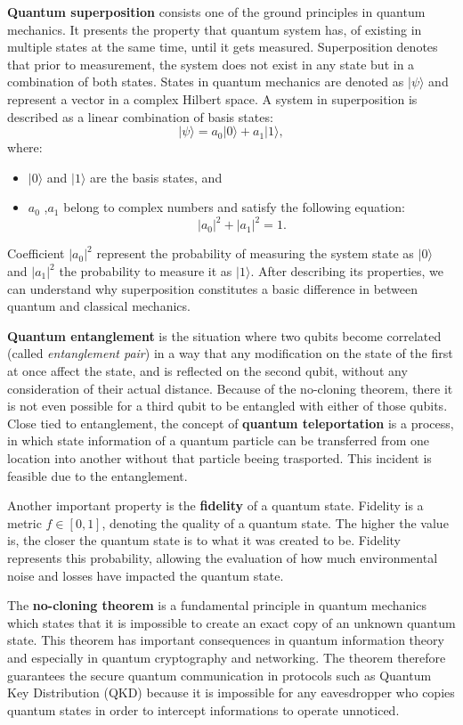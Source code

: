 \documentclass[12pt,a4paper] {report}
\begin{document}
		\textbf{Quantum superposition} consists one of the ground principles in quantum mechanics. 
		It presents the property that quantum system has, of existing in multiple states at the same time, until it gets measured. 
		Superposition denotes that prior to measurement, the system does not exist in any state but in a combination of both states.
		States in quantum mechanics are denoted as $|\psi\rangle$ and represent a vector in a complex Hilbert space. 
		A system in superposition is described as a linear combination of basis states:
			\[
			|\psi\rangle = a_0 |0\rangle + a_1 |1\rangle,
			\]
		where:
		\begin{itemize}
			\item $|0\rangle$ and $|1\rangle$ are the basis states, and
			\item $a_0$ ,$a_1$ belong to complex numbers and satisfy the following equation:
			\[
			|a_0|^2 + |a_1|^2 = 1.
			\]
		\end{itemize}

		Coefficient $|a_0|^2$ represent the probability of measuring the system state as $|0\rangle$ and $|a_1|^2$ the probability to measure it
		as $|1\rangle$. After describing its properties, we can understand why superposition constitutes a 
		basic difference in between quantum and classical mechanics. 

		\textbf{Quantum entanglement} is the situation where two qubits become correlated
		(called \textit{entanglement pair}) in a way that
		any modification on the state of the first at once affect the state, and is reflected on the second qubit, 
		without any consideration of their actual distance. Because of the no-cloning theorem, there it is not even
		possible for a third qubit to be entangled with either of those qubits. Close tied to entanglement, the concept
		of \textbf{quantum teleportation} is a process, in which state information of a quantum particle can be transferred
		from one location into another without that particle beeing trasported.
		This incident is feasible due to the entanglement.
		
		Another important property is the \textbf{fidelity} of a quantum state.
		Fidelity is a metric  \( \textit{f} \in [0,1] \), denoting the quality of a quantum state.
		The higher the value is, the closer the quantum state is to what it was created to be.
		Fidelity represents this probability, allowing the evaluation of how much environmental noise
		and losses have impacted the quantum state.

		The \textbf{no-cloning theorem} is a fundamental principle in quantum mechanics 
		which states that it is impossible to create an exact copy of an unknown quantum state. 
		This theorem has important consequences in quantum information theory and especially in
		quantum cryptography and networking. The theorem therefore guarantees the secure quantum communication 
		in protocols such as Quantum Key Distribution (QKD) because it is impossible for any eavesdropper who copies
		quantum states in order to intercept informations to operate unnoticed.
\end{document}
